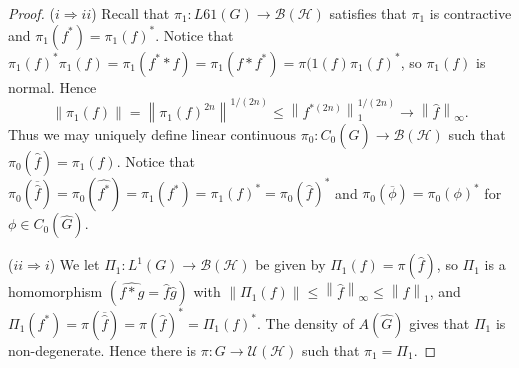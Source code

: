 \documentclass[11pt, a4paper]{memoir}
\newcommand{\imp}[2]{($#1\Rightarrow#2$)\hspace{0.2cm}}
\newcommand{\norm}[1]{\ensuremath{\left\lVert#1\right\rVert}}
\theoremstyle{change}
\theoremstyle{plain}
\theoremstyle{nonumberplain}
\newtheorem{proof}{Proof}
\numberwithin{equation}{section}
\begin{document}
\begin{proof}
    \imp{i}{ii}
    Recall that $\pi_1:L61(G)\to\mathcal{B}(\mathcal{H})$ satisfies that $\pi_1$ is contractive and $\pi_1(f^*)=\pi_1(f)^*$.
    Notice that $\pi_1(f)^*\pi_1(f)=\pi_1(f^**f)=\pi_1(f*f^*)=\pi(1(f)\pi_1(f)^*$, so $\pi_1(f)$ is normal.
    Hence
    \begin{equation*}
        \norm{\pi_1(f)}=\norm{\pi_1(f)^{2n}}^{1/(2n)}\leq\norm{f^{*(2n)}}_1^{1/(2n)}\to\norm{\hat{f}}_\infty.
    \end{equation*}
    Thus we may uniquely define linear continuous $\pi_0:C_0(\widehat{G})\to\mathcal{B}(\mathcal{H})$ such that $\pi_0(\hat{f})=\pi_1(f)$.
    Notice that $\pi_0(\overline{\hat{f}})=\pi_0(\hat{f^*})=\pi_1(f^*)=\pi_1(f)^*=\pi_0(\hat{f})^*$ and $\pi_0(\overline{\phi})=\pi_0(\phi)^*$ for $\phi\in C_0(\widehat{G})$.

    \imp{ii}{i}
    We let $\Pi_1:L^1(G)\to\mathcal{B}(\mathcal{H})$ be given by $\Pi_1(f)=\pi(\hat{f})$, so $\Pi_1$ is a homomorphism $(\widehat{f*g}=\hat{f}\hat{g})$ with $\norm{\Pi_1(f)}\leq \norm{\hat{f}}_\infty\leq\norm{f}_1$, and $\Pi_1(f^*)=\pi(\overline{\hat{f}})=\pi(\hat{f})^*=\Pi_1(f)^*$.
    The density of $A(\widehat{G})$ gives that $\Pi_1$ is non-degenerate.
    Hence there is $\pi:G\to\mathcal{U}(\mathcal{H})$ such that $\pi_1=\Pi_1$.
\end{proof}
\end{document}
